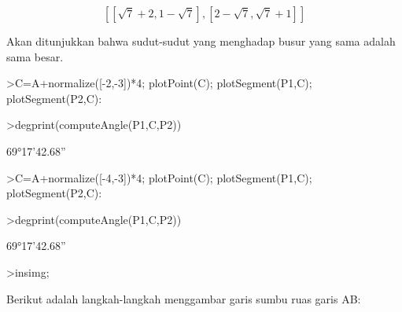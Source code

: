 \documentclass[12pt,arial,letterpaper]{book}
\begin{document}
\begin{eulernootebook}
\begin{eulercomment}
\begin{eulercomment}
\begin{eulernootebook}
\begin{eulercomment}
\begin{eulercomment}
\begin{eulercomment}
\begin{eulercomment}
\begin{eulercomment}
\begin{eulercomment}
\begin{eulernotebook}
\begin{eulercomment}
\begin{eulercomment}
\begin{euleroutput}
\end{euleroutput}
\begin{eulerformula}
\[
\left[ \left[ \sqrt{7}+2 , 1-\sqrt{7} \right]  , \left[ 2-\sqrt{7}
  , \sqrt{7}+1 \right]  \right] 
\]
\end{eulerformula}
\begin{eulercomment}
Akan ditunjukkan bahwa sudut-sudut yang menghadap busur yang sama
adalah sama besar.
\end{eulercomment}
\begin{eulerprompt}
>C=A+normalize([-2,-3])*4; plotPoint(C); plotSegment(P1,C); plotSegment(P2,C):
\end{eulerprompt}
\begin{eulerprompt}
>degprint(computeAngle(P1,C,P2))
\end{eulerprompt}
\begin{euleroutput}
  69°17'42.68''
\end{euleroutput}
\begin{eulerprompt}
>C=A+normalize([-4,-3])*4; plotPoint(C); plotSegment(P1,C); plotSegment(P2,C):
\end{eulerprompt}
\begin{eulerprompt}
>degprint(computeAngle(P1,C,P2))
\end{eulerprompt}
\begin{euleroutput}
  69°17'42.68''
\end{euleroutput}
\begin{eulerprompt}
>insimg;
\end{eulerprompt}
\begin{eulercomment}
Berikut adalah langkah-langkah menggambar garis sumbu ruas garis AB:


\end{eulercomment}
\end{eulercomment}
\end{eulercomment}
\end{eulernotebook}
\end{eulercomment}
\end{eulercomment}
\end{eulercomment}
\end{eulercomment}
\end{eulercomment}
\end{eulercomment}
\end{eulernootebook}
\end{eulercomment}
\end{eulercomment}
\end{eulernootebook}
\end{document}
